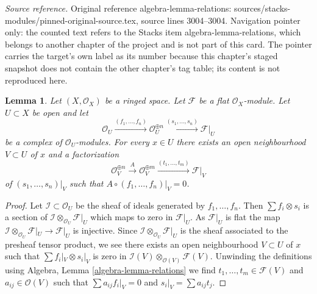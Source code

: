 \documentclass[10pt,a4paper]{amsart}
\theoremstyle{plain}
\newtheorem{lemma}[subsection]{Lemma}
\theoremstyle{definition}
\theoremstyle{remark}
\numberwithin{equation}{subsection}
\begin{document}
\noindent\textit{Source reference.} Original reference algebra-lemma-relations: sources/stacks-modules/pinned-original-source.tex, source lines 3004--3004. Navigation pointer only: the counted text refers to the Stacks item algebra-lemma-relations, which belongs to another chapter of the project and is not part of this card. The pointer carries the target's own label as its number because this chapter's staged snapshot does not contain the other chapter's tag table; its content is not reproduced here.\par\medskip
\begin{lemma}
\label{lemma-flat-eq}
Let $(X, \mathcal{O}_X)$ be a ringed space. Let $\mathcal{F}$ be a flat
$\mathcal{O}_X$-module. Let $U \subset X$ be open and let
$$
\mathcal{O}_U \xrightarrow{(f_1, \ldots, f_n)}
\mathcal{O}_U^{\oplus n} \xrightarrow{(s_1, \ldots, s_n)}
\mathcal{F}|_U
$$
be a complex of $\mathcal{O}_U$-modules. For every $x \in U$ there
exists an open neighbourhood $V \subset U$ of $x$ and a factorization
$$
\mathcal{O}_V^{\oplus n}
\xrightarrow{A}
\mathcal{O}_V^{\oplus m} \xrightarrow{(t_1, \ldots, t_m)}
\mathcal{F}|_V
$$
of $(s_1, \ldots, s_n)|_V$ such that $A \circ (f_1, \ldots, f_n)|_V = 0$.
\end{lemma}

\begin{proof}
Let $\mathcal{I} \subset \mathcal{O}_U$ be the sheaf of ideals
generated by $f_1, \ldots, f_n$. Then $\sum f_i \otimes s_i$ is
a section of $\mathcal{I} \otimes_{\mathcal{O}_U} \mathcal{F}|_U$
which maps to zero in $\mathcal{F}|_U$. As $\mathcal{F}|_U$ is flat
the map
$\mathcal{I} \otimes_{\mathcal{O}_U} \mathcal{F}|_U \to \mathcal{F}|_U$
is injective. Since $\mathcal{I} \otimes_{\mathcal{O}_U} \mathcal{F}|_U$
is the sheaf associated to the presheaf tensor product, we see
there exists an open neighbourhood $V \subset U$ of $x$ such
that $\sum f_i|_V \otimes s_i|_V$ is zero in
$\mathcal{I}(V) \otimes_{\mathcal{O}(V)} \mathcal{F}(V)$.
Unwinding the definitions using Algebra, Lemma \ref{algebra-lemma-relations}
we find $t_1, \ldots, t_m \in \mathcal{F}(V)$ and $a_{ij} \in \mathcal{O}(V)$
such that $\sum a_{ij}f_i|_V = 0$ and $s_i|_V = \sum a_{ij}t_j$.
\end{proof}
\end{document}
